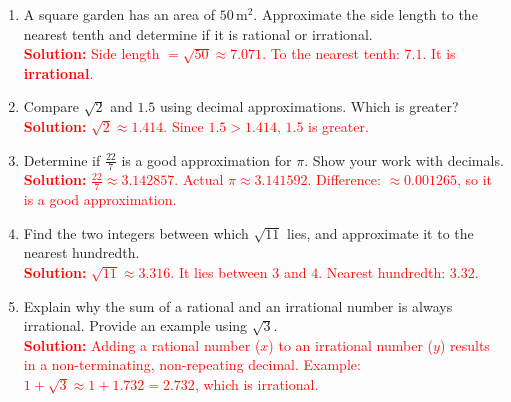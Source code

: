 \documentclass[12pt]{article}
\begin{document}
\vspace{1em}

\begin{tcolorbox}[colframe=black!60, colback=white, 
coltitle=black, colbacktitle=black!15, fonttitle=\bfseries\Large, 
title=Problems, halign title=center, left=10pt, right=10pt, top=10pt, bottom=60pt]
\begin{enumerate}[start=6, itemsep=5em]
    \item A square garden has an area of \( 50 \, \text{m}^2 \). Approximate the side length to the nearest tenth and determine if it is rational or irrational.\\
    \textcolor{red}{\textbf{Solution:} Side length \(= \sqrt{50} \approx 7.071 \). To the nearest tenth: \(7.1\). It is \textbf{irrational}.}

    \item Compare \( \sqrt{2} \) and \( 1.5 \) using decimal approximations. Which is greater?\\
    \textcolor{red}{\textbf{Solution:} \( \sqrt{2} \approx 1.414 \). Since \(1.5 > 1.414\), \(1.5\) is greater.}

    \item Determine if \( \frac{22}{7} \) is a good approximation for \( \pi \). Show your work with decimals.\\
    \textcolor{red}{\textbf{Solution:} \( \frac{22}{7} \approx 3.142857 \). Actual \( \pi \approx 3.141592 \). Difference: \( \approx 0.001265 \), so it is a good approximation.}

    \item Find the two integers between which \( \sqrt{11} \) lies, and approximate it to the nearest hundredth.\\
    \textcolor{red}{\textbf{Solution:} \( \sqrt{11} \approx 3.316 \). It lies between \(3\) and \(4\). Nearest hundredth: \(3.32\).}

    \item Explain why the sum of a rational and an irrational number is always irrational. Provide an example using \( \sqrt{3} \).\\
    \textcolor{red}{\textbf{Solution:} Adding a rational number (\(x\)) to an irrational number (\(y\)) results in a non-terminating, non-repeating decimal. Example: \(1 + \sqrt{3} \approx 1 + 1.732 = 2.732\), which is irrational.}
\end{enumerate}
\end{tcolorbox}

\vspace{1em}
\end{document}
